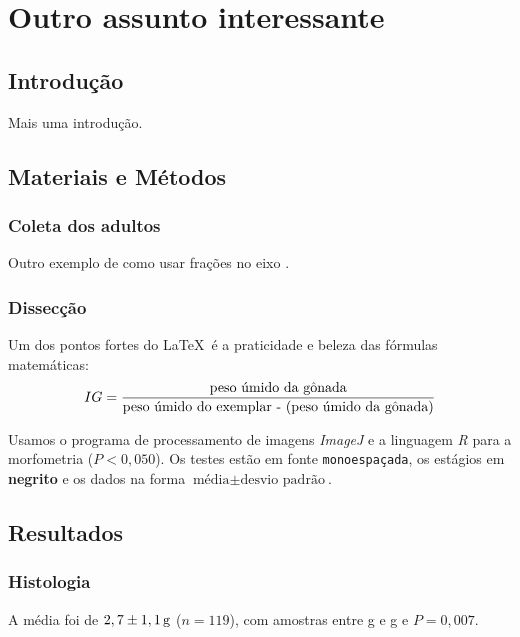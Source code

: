 \chapter{Outro assunto interessante}\label{cap3}

\section{Introdução}\label{cap3:intro}

Mais uma introdução.

\section{Materiais e Métodos}\label{cap3:mem}

\subsection{Coleta dos adultos}\label{cap3:mem:coleta}

Outro exemplo de como usar frações no eixo .

\subsection{Dissecção}\label{cap3:mem:diss}

Um dos pontos fortes do \LaTeX\ é a praticidade e beleza das fórmulas matemáticas:
\begin{equation}\label{eq:ind}\notag
IG=\frac{\text{peso úmido da gônada}}{\text{peso úmido do exemplar - (peso úmido da gônada)}}
\end{equation}

Usamos o programa de processamento de imagens \emph{ImageJ} \citep{Rasband1997} e a linguagem \emph{R} \citep{R2005} para a morfometria ($P<0,050$).
Os testes estão em fonte \texttt{monoespaçada}, os estágios em \textbf{negrito} e os dados na forma $\text{média} \pm \text{desvio padrão}$.

\section{Resultados}\label{cap3:res}

\subsection{Histologia}\label{cap3:res:histo}

A média foi de $2,7\pm\unit[1,1]{g}$ ($n=119$), com amostras entre \unit[0,6]{g} e \unit[7,7]{g} e $P=0,007$.

